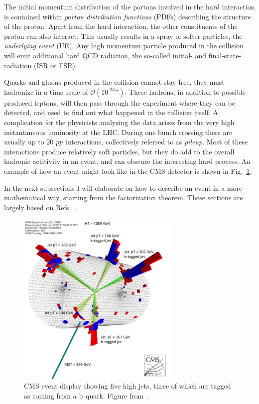 The initial momentum distribution of the partons involved in the hard interaction is contained
within \textit{parton distribution functions} (PDFs) describing the structure of the proton. 
Apart from the hard interaction, the other constituents of the proton can also interact. This
usually results in a spray of softer particles, the \textit{underlying event} (UE). 
Any high momentum particle produced in the collision will emit additional hard QCD radiation, the
so-called initial- and final-state-radiation (ISR or FSR).

Quarks and gluons produced in the collision cannot stay free, they must hadronize in a time scale
of $\mathcal{O}(\text{10}^{\text{-23}}\second)$. These hadrons, in addition to possible produced
leptons, will then pass through the experiment where they can be detected, and used to find out
what happened in the collision itself. 
A complication for the physicists analyzing the data arises from the very high
instantaneous luminosity at the LHC. During one bunch crossing there are usually up to 20
${p}{p}$ interactions, collectively referred to as \textit{pileup}. Most of these interactions
produce relatively soft particles, but they do add to the overall hadronic actitivity in an event,
and can obscure the interesting hard process. 
An example of how an event might look like in the CMS detector is shown in
Fig.~\ref{fig:event_display}. 

In the next subsections I will elaborate on how to describe an event in a more mathematical way,
starting from the factorization theorem. These sections are largely based on
Refs.~\cite{Campbell:2006wx,Skands:2011pf,Salam_Bautzen,Salam:2010zt,Tung:2001cv}.

\begin{figure}[htpb]
  \centering
  \includegraphics[width=0.7\textwidth]{figures/eventreco_event/event_display_SUS12024}
  \caption{CMS event display showing five high \pt jets, three of which are tagged as coming from a
$\mathrm{b}$ quark. Figure from~\cite{SUS12024_event_display}.
  \label{fig:event_display}}
\end{figure}


